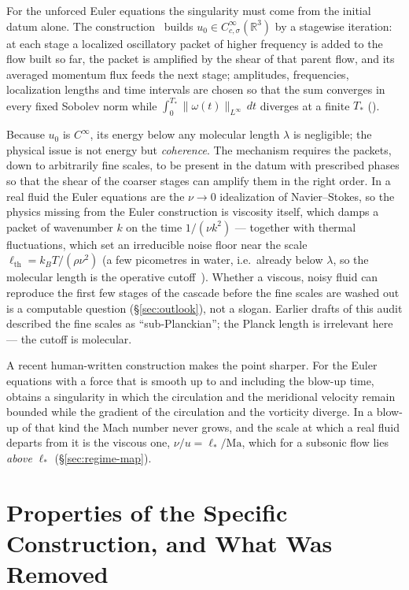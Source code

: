 \documentclass[11pt,a4paper]{article}
\begin{document}
For the unforced Euler equations the singularity must come from the initial datum alone. The
construction~\cite{OpenAIEuler2026} builds $u_0\in C^\infty_{c,\sigma}(\mathbb{R}^3)$ by a stagewise
iteration: at each stage a localized oscillatory packet of higher frequency is added to the flow
built so far, the packet is amplified by the shear of that parent flow, and its averaged momentum
flux feeds the next stage; amplitudes, frequencies, localization lengths and time intervals are
chosen so that the sum converges in every fixed Sobolev norm while
$\int_0^{T_*}\|\omega(t)\|_{L^\infty}\,dt$ diverges at a finite $T_*$ (\cite[\S\S2--5]{OpenAIEuler2026}).

Because $u_0$ is $C^\infty$, its energy below any molecular length $\lambda$ is negligible; the
physical issue is not energy but \emph{coherence}. The mechanism requires the packets, down to
arbitrarily fine scales, to be present in the datum with prescribed phases so that the shear of the
coarser stages can amplify them in the right order. In a real fluid the Euler equations are the
$\nu\to0$ idealization of Navier--Stokes, so the physics missing from the Euler construction is
viscosity itself, which damps a packet of wavenumber $k$ on the time $1/(\nu k^2)$ --- together with
thermal fluctuations, which set an irreducible noise floor near the scale
$\ell_{\text{th}}=k_BT/(\rho\nu^2)$ (a few picometres in water, i.e.\ already below $\lambda$, so the
molecular length is the operative cutoff~\cite{Bandak2022}). Whether a viscous, noisy fluid can
reproduce the first few stages of the cascade before the fine scales are washed out is a computable
question (\S\ref{sec:outlook}), not a slogan. Earlier drafts of this audit described the fine scales
as ``sub-Planckian''; the Planck length is irrelevant here --- the cutoff is molecular.

A recent human-written construction makes the point sharper. For the Euler equations with a force
that is smooth up to and including the blow-up time, \cite{EulerSmoothForcing2026} obtains a
singularity in which the circulation and the meridional velocity remain bounded while the gradient
of the circulation and the vorticity diverge. In a blow-up of that kind the Mach number never grows,
and the scale at which a real fluid departs from it is the viscous one, $\nu/u=\ell_*/\mathrm{Ma}$,
which for a subsonic flow lies \emph{above} $\ell_*$ (\S\ref{sec:regime-map}).

\section{Properties of the Specific Construction, and What Was Removed}
\label{sec:numerics}
\end{document}
